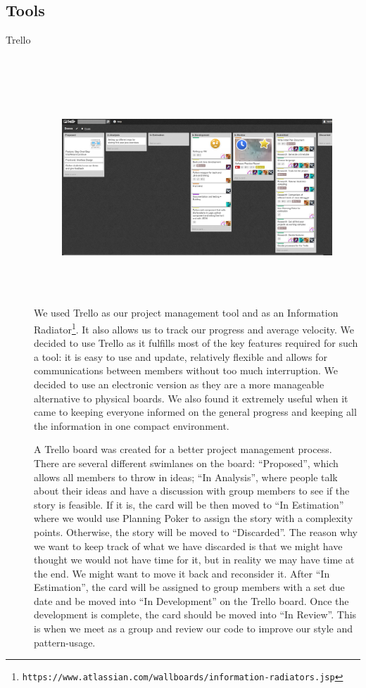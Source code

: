 \documentclass[11pt, a4paper]{article}
\begin{document}
\subsection{Tools}
\begin{description}

\item[Trello] \hfill \\
\begin{figure}[h!]
\centering
\includegraphics[height=80mm,width=130mm]{Trello.png}
\end{figure}

We used Trello as our project management tool and as an Information Radiator\footnote{\tt{https://www.atlassian.com/wallboards/information-radiators.jsp}}.
It also allows us to track our progress and average velocity. 
We decided to use Trello as it fulfills most of the key features required for such a tool: it is easy to use and update, relatively flexible and allows for communications between members without too much interruption. 
We decided to use an electronic version as they are a more manageable alternative to physical boards. 
We also found it extremely useful when it came to keeping everyone informed on the general progress and keeping all the information in one compact environment.

A Trello board was created for a better project management process. 
There are several different swimlanes on the board: ``Proposed'', which allows all members to throw in ideas; ``In Analysis'', where people talk about their ideas and have a discussion with group members to see if the story is feasible. 
If it is, the card will be then moved to ``In Estimation'' where we would use Planning Poker to assign the story with a complexity points.
Otherwise, the story will be moved to ``Discarded''.
The reason why we want to keep track of what we have discarded is that we might have thought we would not have time for it, but in reality we may have time at the end.
We might want to move it back and reconsider it. 
After ``In Estimation'', the card will be assigned to group members with a set due date and be moved into ``In Development'' on the Trello board. 
Once the development is complete, the card should be moved into ``In Review''. 
This is when we meet as a group and review our code to improve our style and pattern-usage.


\end{description}
\end{document}
